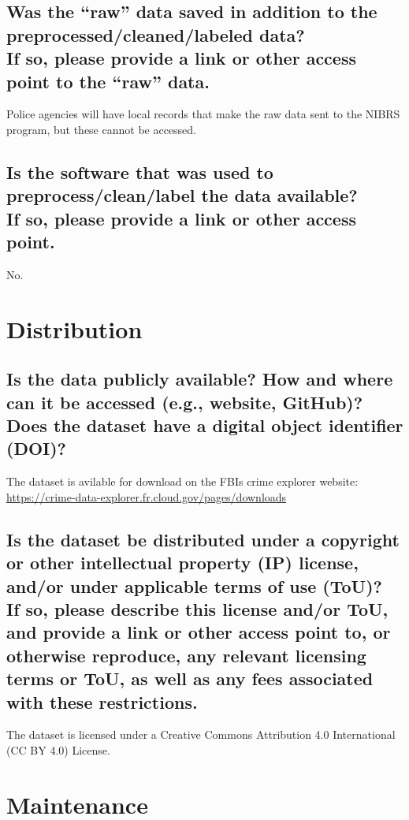 \documentclass[letterpaper, 10 pt, conference]{ieeeconf}  %
\newcommand{\subtitle}[1]{{\\ \small \normalfont \color{purple} #1}}
\begin{document}
\lipsum[1]

\subsection{Was the “raw” data saved in addition to the preprocessed/cleaned/labeled data? \subtitle{If so, please provide a link or other access point to the “raw” data. }}

Police agencies will have local records that make the raw data sent to the NIBRS program, but these cannot be accessed.

\subsection{Is the software that was used to preprocess/clean/label the data available? \subtitle{If so, please provide a link or other access point.}}

No.

\section{Distribution}

\subsection{Is the data publicly available? How and where can it be accessed (e.g., website, GitHub)? \subtitle{Does the dataset have a digital object identifier (DOI)?}}

The dataset is avilable for download on the FBIs crime explorer website: \\ \href{https://crime-data-explorer.fr.cloud.gov/pages/downloads}{https://crime-data-explorer.fr.cloud.gov/pages/downloads}

\subsection{Is the dataset be distributed under a copyright or other intellectual property (IP) license, and/or under applicable terms of use (ToU)? \subtitle{If so, please describe this license and/or ToU, and provide a link or other access point to, or otherwise reproduce, any relevant licensing terms or ToU, as well as any fees associated with these restrictions.}}

The dataset is licensed under a Creative Commons Attribution 4.0 International (CC BY 4.0) License.


\section{Maintenance}
\end{document}
